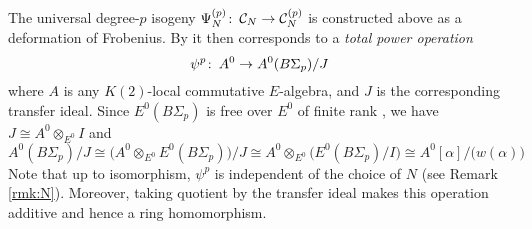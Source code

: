 \documentclass{gtpart}
\theoremstyle{definition}
\theoremstyle{remark}
\def\co{\colon\thinspace}
\newcommand{\CC}{{\cal C}}
\newcommand{\A}{\alpha}
\renewcommand{\=}{\approx}
\renewcommand{\-}{\sim}
\numberwithin{equation}{section}
\numberwithin{thm}{section}
\begin{document}
The universal degree-$p$ isogeny $\Psi_N^{(p)} \co \CC_N \to \CC_N^{(p)}$ is 
constructed above as a deformation of Frobenius.  By \cite[Theorem B]{cong} it 
then corresponds to a {\em total power operation} 
\begin{equation}
 \label{psi}
 \psi^p \co A^0 \to A^0(B\Sigma_p) / J 
\end{equation}
where $A$ is any $K(2)$-local commutative $E$-algebra, and $J$ is the 
corresponding transfer ideal.  Since $E^0(B\Sigma_p)$ is free over $E^0$ of 
finite rank \cite[Theorem 3.2]{Str98}, we have $J \cong A^0 \otimes_{E^0} I$ and 
\[
 A^0(B\Sigma_p) / J \cong \big( A^0 \otimes_{E^0} E^0(B\Sigma_p) \big) / J \cong 
 A^0 \otimes_{E^0} \big( E^0(B\Sigma_p) / I \big) \cong 
 A^0[\A] / \big( w(\A) \big) 
\]
Note that up to isomorphism, $\psi^p$ is independent of the choice of $N$ (see 
Remark \ref{rmk:N}).  Moreover, taking quotient by the transfer ideal makes this 
operation additive and hence a ring homomorphism.  
\end{document}
